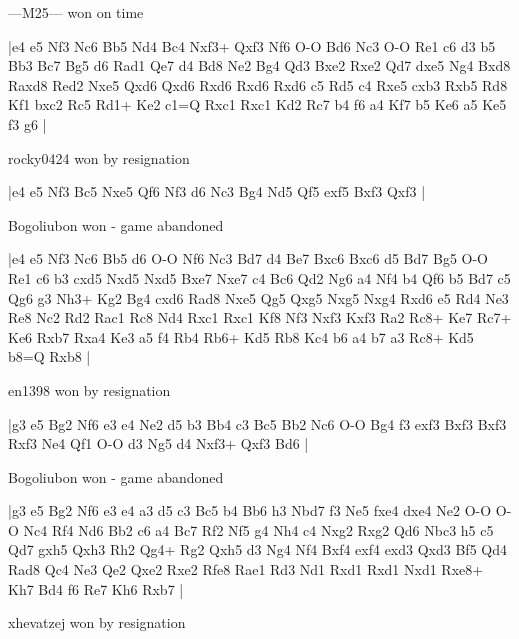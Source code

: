 \showboard

---M25--- won on time

\makegametitle
|e4 e5 Nf3 Nc6 Bb5 Nd4 Bc4 Nxf3+ Qxf3 Nf6 O-O Bd6 Nc3 O-O Re1 c6 d3 b5 Bb3 Bc7 Bg5 d6 Rad1 Qe7 d4 Bd8 Ne2 Bg4 Qd3 Bxe2 Rxe2 Qd7 dxe5 Ng4 Bxd8 Raxd8 Red2 Nxe5 Qxd6 Qxd6 Rxd6 Rxd6 Rxd6 c5 Rd5 c4 Rxe5 cxb3 Rxb5 Rd8 Kf1 bxc2 Rc5 Rd1+ Ke2 c1=Q Rxc1 Rxc1 Kd2 Rc7 b4 f6 a4 Kf7 b5 Ke6 a5 Ke5 f3 g6  |

\showboard

rocky0424 won by resignation

\makegametitle
|e4 e5 Nf3 Bc5 Nxe5 Qf6 Nf3 d6 Nc3 Bg4 Nd5 Qf5 exf5 Bxf3 Qxf3  |

\showboard

Bogoliubon won - game abandoned

\makegametitle
|e4 e5 Nf3 Nc6 Bb5 d6 O-O Nf6 Nc3 Bd7 d4 Be7 Bxc6 Bxc6 d5 Bd7 Bg5 O-O Re1 c6 b3 cxd5 Nxd5 Nxd5 Bxe7 Nxe7 c4 Bc6 Qd2 Ng6 a4 Nf4 b4 Qf6 b5 Bd7 c5 Qg6 g3 Nh3+ Kg2 Bg4 cxd6 Rad8 Nxe5 Qg5 Qxg5 Nxg5 Nxg4 Rxd6 e5 Rd4 Ne3 Re8 Nc2 Rd2 Rac1 Rc8 Nd4 Rxc1 Rxc1 Kf8 Nf3 Nxf3 Kxf3 Ra2 Rc8+ Ke7 Rc7+ Ke6 Rxb7 Rxa4 Ke3 a5 f4 Rb4 Rb6+ Kd5 Rb8 Kc4 b6 a4 b7 a3 Rc8+ Kd5 b8=Q Rxb8  |

\showboard

en1398 won by resignation

\makegametitle
|g3 e5 Bg2 Nf6 e3 e4 Ne2 d5 b3 Bb4 c3 Bc5 Bb2 Nc6 O-O Bg4 f3 exf3 Bxf3 Bxf3 Rxf3 Ne4 Qf1 O-O d3 Ng5 d4 Nxf3+ Qxf3 Bd6  |

\showboard

Bogoliubon won - game abandoned

\makegametitle
|g3 e5 Bg2 Nf6 e3 e4 a3 d5 c3 Bc5 b4 Bb6 h3 Nbd7 f3 Ne5 fxe4 dxe4 Ne2 O-O O-O Nc4 Rf4 Nd6 Bb2 c6 a4 Bc7 Rf2 Nf5 g4 Nh4 c4 Nxg2 Rxg2 Qd6 Nbc3 h5 c5 Qd7 gxh5 Qxh3 Rh2 Qg4+ Rg2 Qxh5 d3 Ng4 Nf4 Bxf4 exf4 exd3 Qxd3 Bf5 Qd4 Rad8 Qc4 Ne3 Qe2 Qxe2 Rxe2 Rfe8 Rae1 Rd3 Nd1 Rxd1 Rxd1 Nxd1 Rxe8+ Kh7 Bd4 f6 Re7 Kh6 Rxb7  |

\showboard

xhevatzej won by resignation

